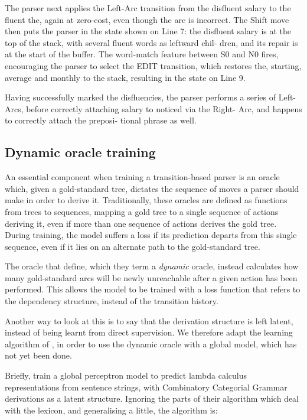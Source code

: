 \documentclass[11pt,letterpaper]{article}
\begin{document}
The parser next applies the Left-Arc transition from the disfluent salary to the
fluent the, again at zero-cost, even though the arc is incorrect. The Shift move
then puts the parser in the state shown on Line 7: the disfluent salary is at
the top of the stack, with several fluent words as leftward chil- dren, and its
repair is at the start of the buffer. The word-match feature between S0 and N0
fires, encouraging the parser to select the EDIT transition, which restores the,
starting, average and monthly to the stack, resulting in the state on Line 9.

Having successfully marked the disfluencies, the parser performs a series of
Left-Arcs, before correctly attaching salary to noticed via the Right- Arc,
and happens to correctly attach the preposi- tional phrase as well.

\subsection{Dynamic oracle training}

An essential component when training a transition-based parser is an oracle which,
given a gold-standard tree, dictates the sequence of moves a parser should make
in order to derive it. Traditionally, these oracles are defined as functions from
trees to sequences, mapping a gold tree to a single sequence of actions deriving it,
even if more than one sequence of actions derives the gold tree. During training,
the model suffers a loss if its prediction departs from this single 
sequence, even if it lies on an alternate path to the gold-standard tree.

The oracle that \citet{goldberg:12} define, which they term a \emph{dynamic} oracle,
instead calculates how many gold-standard arcs will be newly unreachable after a
given action has been performed. This allows the model to be trained with a
loss function that refers to the dependency structure, instead of the transition
history.  

Another way to look at this is to say that the derivation structure is left latent,
instead of being learnt from direct supervision.  
We therefore adapt the learning
algorithm of \citet{zettlemoyer:07}, in order to use the dynamic oracle with
a global model, which has not yet been done.

Briefly, \citeauthor{zettlemoyer:07} train a global perceptron model to predict
lambda calculus representations from sentence strings, with Combinatory
Categorial Grammar derivations as a latent structure.  Ignoring the parts of
their algorithm which deal with the lexicon, and generalising a little, the algorithm is:
\end{document}
